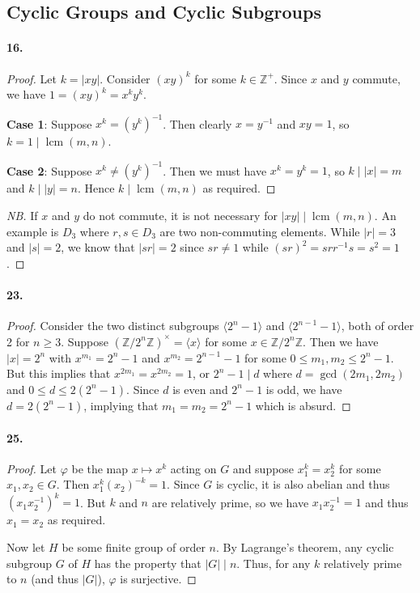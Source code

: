 \documentclass{article}
\DeclareMathOperator{\lcm}{lcm}
\begin{document}
\subsection{Cyclic Groups and Cyclic Subgroups}

\paragraph{16.}
\begin{proof}
  Let $k = |xy|$. Consider $(xy)^k$ for some $k \in \mathbb{Z}^+$. Since $x$
  and $y$ commute, we have $1 = (xy)^k = x^ky^k$.

  \textbf{Case 1}: Suppose $x^k = (y^k)^{-1}$. Then clearly $x = y^{-1}$ and
  $xy = 1$, so $k = 1 \mid \lcm(m, n)$.

  \textbf{Case 2}: Suppose $x^k \neq (y^k)^{-1}$. Then we must have $x^k = y^k =
  1$, so $k \mid |x| = m$ and $k \mid |y| = n$. Hence $k \mid \lcm(m, n)$ as
  required.
\end{proof}
\begin{proof}[NB]
  If $x$ and $y$ do not commute, it is not necessary for $|xy| \mid \lcm(m, n)$.
  An example is $D_3$ where $r, s \in D_3$ are two non-commuting elements.
  While $|r| = 3$ and $|s| = 2$, we know that $|sr| = 2$ since $sr \neq 1$ while
  $(sr)^2 = srr^{-1}s = s^2 = 1$.
\end{proof}

\paragraph{23.}
\begin{proof}
  Consider the two distinct subgroups $\langle 2^n - 1 \rangle$ and $\langle
  2^{n-1} - 1 \rangle$, both of order 2 for $n \geq 3$. Suppose
  $(\mathbb{Z}/2^n\mathbb{Z})^\times = \langle x \rangle$ for some $x \in
  \mathbb{Z}/2^n\mathbb{Z}$. Then we have $|x| = 2^n$ with $x^{m_1} = 2^n - 1$
  and $x^{m_2} = 2^{n-1} - 1$ for some $0 \leq m_1, m_2 \leq 2^n - 1$. But this
  implies that $x^{2m_1} = x^{2m_2} = 1$, or $2^n - 1 \mid d$ where $d =
  \gcd(2m_1, 2m_2)$ and $0 \leq d \leq 2(2^n - 1)$. Since $d$ is even and $2^n
  - 1$ is odd, we have $d = 2(2^n - 1)$, implying that $m_1 = m_2 = 2^n - 1$
  which is absurd.
\end{proof}

\paragraph{25.}
\begin{proof}
  Let $\varphi$ be the map $x \mapsto x^k$ acting on $G$ and suppose $x_1^k =
  x_2^k$ for some $x_1, x_2 \in G$. Then $x_1^k(x_2)^{-k} = 1$. Since $G$ is
  cyclic, it is also abelian and thus $(x_1x_2^{-1})^k = 1$. But $k$ and $n$ are
  relatively prime, so we have $x_1x_2^{-1} = 1$ and thus $x_1 = x_2$ as
  required.

  Now let $H$ be some finite group of order $n$. By Lagrange's theorem, any
  cyclic subgroup $G$ of $H$ has the property that $|G| \mid n$. Thus, for any
  $k$ relatively prime to $n$ (and thus $|G|$), $\varphi$ is surjective.
\end{proof}
\end{document}
